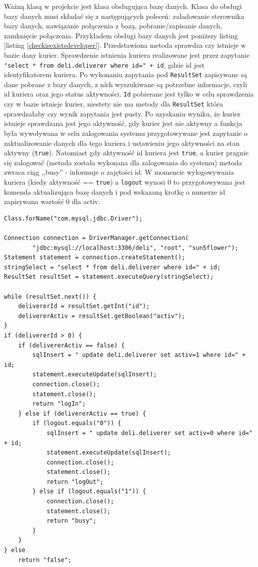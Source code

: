 \documentclass[eng,printmode,oneside]{mgr}
\begin{document}
Ważną klasą w projekcie jest klasa obsługująca bazę danych. Klasa do obsługi
bazy danych musi składać się z następujących poleceń: załadowanie sterownika
bazy danych, nawiązanie połączenia z bazą, pobranie/zapisanie danych, zamknięcie
połączenia. Przykładem obsługi bazy danych jest poniższy listing [listing
\ref{checkisexistsdeveloper}]. Przedstawiona metoda sprawdza czy istnieje w
bazie dany kurier. Sprawdzenie istnienia kuriera realizowane jest przez
zapytanie \texttt{"select * from deli.deliverer where id=" + id}, gdzie id jest
identyfikatorem kuriera. Po wykonaniu zapytania pod \texttt{ResultSet}
zapisywane są dane pobrane z bazy danych, z nich wyszukiwane są potrzebne informacje, czyli
id kuriera oraz jego status aktywności. \texttt{Id} pobierane jest tylko w celu
sprawdzenia czy w bazie istnieje kurier, niestety nie ma metody dla
\texttt{ResultSet} która sprawdzałaby czy wynik zapytania jest pusty. Po
uzyskaniu wyniku, że kurier istnieje sprawdzana jest jego aktywność, gdy kurier
jest nie aktywny a funkcja była wywoływana w celu zalogowania systemu
przygotowywane jest zapytanie o zaktualizowanie danych dla tego kuriera i
ustawieniu jego aktywności na stan aktywny (\texttt{true}). Natomiast gdy
aktywność id kuriera jest \texttt{true}, a kurier pragnie się zalogować (metoda została
wykonana dla zalogowania do systemu) metoda zwraca ciąg ,,busy'' - informuje o zajętości id.
W momencie wylogowywania kuriera (kiedy aktywność == \texttt{true}) a
\texttt{logout} wynosi 0 to przygotowywana jest komenda aktualizująca bazę
danych i pod wskazaną krotkę o numerze id zapisywana wartość 0 dla activ.

\begin{lstlisting}[caption=Połączenia z bazą danych na przykładzie metody
sprawdzającej istnienie kuriera oraz jego stan
używanej przez aplikację mobilną,label=checkisexistsdeveloper]
Class.forName("com.mysql.jdbc.Driver");

Connection connection = DriverManager.getConnection(
		"jdbc:mysql://localhost:3306/deli", "root", "sun5flower");
Statement statement = connection.createStatement();
stringSelect = "select * from deli.deliverer where id=" + id;
ResultSet resultSet = statement.executeQuery(stringSelect);

while (resultSet.next()) {
	delivererId = resultSet.getInt("id");
	delivererActiv = resultSet.getBoolean("activ");
} 
if (delivererId > 0) {
	if (delivererActiv == false) {
		sqlInsert = " update deli.deliverer set activ=1 where id=" + id;
		statement.executeUpdate(sqlInsert);
		connection.close();
		statement.close();
		return "logIn";
	} else if (delivererActiv == true) {
		if (logout.equals("0")) {
			sqlInsert = " update deli.deliverer set activ=0 where id=" + id;
			statement.executeUpdate(sqlInsert);
			connection.close();
			statement.close();
			return "logOut";
		} else if (logout.equals("1")) {
			connection.close();
			statement.close();
			return "busy";
		}
	}
} else
	return "false";
\end{lstlisting}
\end{document}
